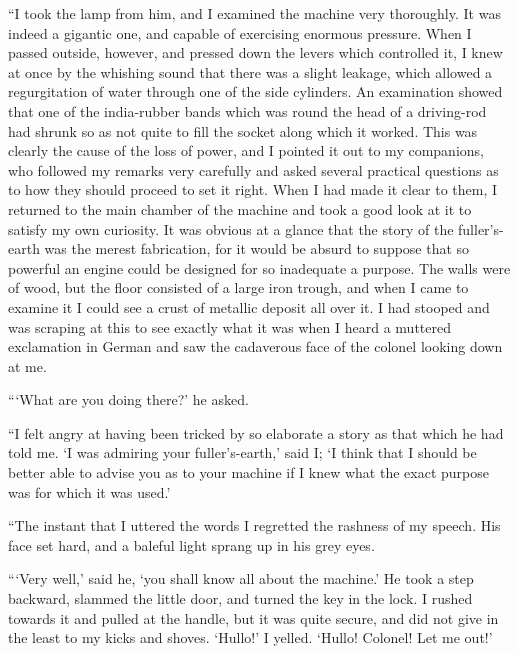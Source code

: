 \documentclass{article}
\begin{document}
``I took the lamp from him, and I examined the machine very
thoroughly. It was indeed a gigantic one, and capable of exercising
enormous pressure. When I passed outside, however, and pressed down
the levers which controlled it, I knew at once by the whishing sound
that there was a slight leakage, which allowed a regurgitation of water
through one of the side cylinders. An examination showed that one of the
india-rubber bands which was round the head of a driving-rod had shrunk
so as not quite to fill the socket along which it worked. This was clearly
the cause of the loss of power, and I pointed it out to my companions, who
followed my remarks very carefully and asked several practical questions
as to how they should proceed to set it right. When I had made it clear
to them, I returned to the main chamber of the machine and took a good
look at it to satisfy my own curiosity. It was obvious at a glance that
the story of the fuller's-earth was the merest fabrication, for it would
be absurd to suppose that so powerful an engine could be designed for so
inadequate a purpose. The walls were of wood, but the floor consisted of
a large iron trough, and when I came to examine it I could see a crust
of metallic deposit all over it. I had stooped and was scraping at this
to see exactly what it was when I heard a muttered exclamation in German
and saw the cadaverous face of the colonel looking down at me.

```What are you doing there?' he asked.

``I felt angry at having been tricked by so elaborate a story as that
which he had told me. `I was admiring your fuller's-earth,' said I;
`I think that I should be better able to advise you as to your machine
if I knew what the exact purpose was for which it was used.'

``The instant that I uttered the words I regretted the rashness of my
speech. His face set hard, and a baleful light sprang up in his grey eyes.

```Very well,' said he, `you shall know all about the machine.' He took
a step backward, slammed the little door, and turned the key in the
lock. I rushed towards it and pulled at the handle, but it was quite
secure, and did not give in the least to my kicks and shoves. `Hullo!' I
yelled. `Hullo! Colonel! Let me out!'
\end{document}
